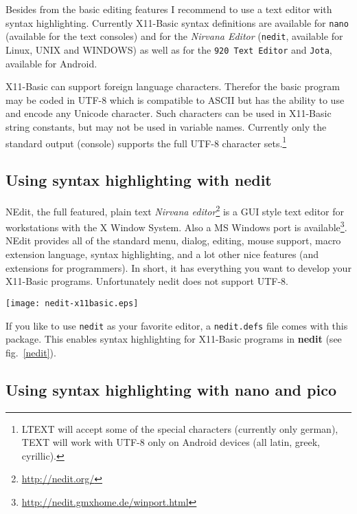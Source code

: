 Besides from the basic editing features I recommend to use a text editor with
syntax highlighting. Currently X11-Basic syntax definitions are available for 
\verb|nano| (available for the text consoles) and for the {\it
Nirvana Editor} (\verb|nedit|, available for Linux, UNIX and WINDOWS)  as well
as for the \verb|920 Text Editor| and \verb|Jota|, available for Android.

X11-Basic can support foreign language characters. Therefor the basic program
may be coded in UTF-8 which is compatible to ASCII but has the ability to use
and encode any Unicode character. Such characters can be used in X11-Basic
string constants, but may not be used in variable names. Currently only the
standard output (console) supports the full UTF-8 character
sets.\footnote{LTEXT will accept some of the special characters
(currently only german), TEXT will work with UTF-8 only on Android
devices (all latin, greek, cyrillic).}

\subsection*{Using syntax highlighting with {\bf nedit}}

NEdit, the full featured, plain text {\it Nirvana 
editor}\footnote{\url{http://nedit.org/}} is a GUI style text editor for
workstations with the X Window System.  Also a MS Windows port is
available\footnote{ \url{http://nedit.gmxhome.de/winport.html}}. NEdit provides
all of the standard menu, dialog, editing, mouse support, macro extension
language, syntax highlighting, and a lot other nice features (and extensions for
programmers). In short, it has everything you want to develop your X11-Basic
programs. Unfortunately nedit does not support UTF-8.

\begin{SCfigure}
\texttt{[image: nedit-x11basic.eps]}
\caption{The Nirvana Editor with syntax highlighting for a X11-Basic program.}
\label{nedit}
\end{SCfigure}

If you like to use \verb|nedit| as your favorite editor, a \verb|nedit.defs| file
comes  with this package. This enables syntax highlighting for X11-Basic
programs in {\bf nedit} (see fig.~\ref{nedit}).

\subsection*{Using syntax highlighting with {\bf nano} and {\bf pico}}

